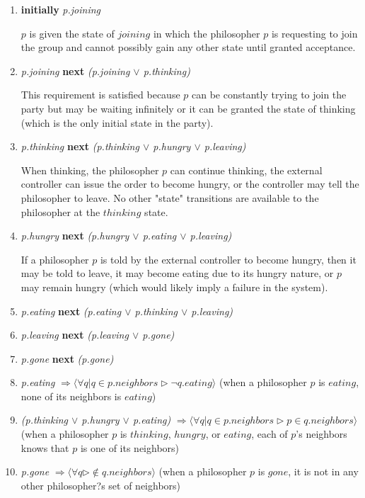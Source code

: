 \documentclass[11pt]{article}
\begin{document}
\begin{enumerate}[S1]
\item {\bfseries initially} {\it p.joining}

$p$ is given the state of $joining$ in which the philosopher $p$ is requesting to join the group and cannot possibly gain any other state until granted acceptance.

\item {\it p.joining} {\bfseries next} {\it (p.joining $\vee$ p.thinking)}

This requirement is satisfied because $p$ can be constantly trying to join the party but may be waiting infinitely or it can be granted the state of thinking (which is the only initial state in the party).

\item {\it p.thinking} {\bfseries next} {\it (p.thinking $\vee$ p.hungry $\vee$ p.leaving)}

When thinking, the philosopher $p$ can continue thinking, the external controller can issue the order to become hungry, or the controller may tell the philosopher to leave. No other "state" transitions are available to the philosopher at the $thinking$ state. 

\item {\it p.hungry} {\bfseries next} {\it (p.hungry $\vee$ p.eating $\vee$ p.leaving)}

If a philosopher $p$ is told by the external controller to become hungry, then it may be told to leave, it may become eating due to its hungry nature, or $p$ may remain hungry (which would likely imply a failure in the system).

\item {\it p.eating} {\bfseries next} {\it (p.eating $\vee$ p.thinking $\vee$ p.leaving)}


\item {\it p.leaving} {\bfseries next} {\it (p.leaving $\vee$ p.gone)}



\item {\it p.gone} {\bfseries next} {\it (p.gone)}



\item {\it p.eating} $\Rightarrow \langle \forall q | q \in p.neighbors \rhd \neg q.eating \rangle$
(when a philosopher $p$ is $eating$, none of its neighbors is $eating$)



\item {\it (p.thinking $\vee$ p.hungry $\vee$ p.eating)} $\Rightarrow \langle \forall q | q \in p.neighbors \rhd p \in q.neighbors \rangle$
(when a philosopher $p$ is $thinking$, $hungry$, or $eating$, each of $p$'s neighbors knows that $p$ is one of its neighbors)


\item {\it p.gone} $\Rightarrow \langle \forall q  \rhd \not\in q.neighbors \rangle$
(when a philosopher $p$ is $gone$, it is not in any other philosopher?s set of neighbors)

\end{enumerate}
\end{document}
